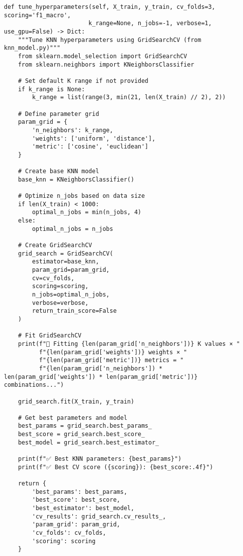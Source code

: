 \begin{verbatim}
def tune_hyperparameters(self, X_train, y_train, cv_folds=3, scoring='f1_macro', 
                        k_range=None, n_jobs=-1, verbose=1, use_gpu=False) -> Dict:
    """Tune KNN hyperparameters using GridSearchCV (from knn_model.py)"""
    from sklearn.model_selection import GridSearchCV
    from sklearn.neighbors import KNeighborsClassifier
    
    # Set default K range if not provided
    if k_range is None:
        k_range = list(range(3, min(21, len(X_train) // 2), 2))
    
    # Define parameter grid
    param_grid = {
        'n_neighbors': k_range,
        'weights': ['uniform', 'distance'],
        'metric': ['cosine', 'euclidean']
    }
    
    # Create base KNN model
    base_knn = KNeighborsClassifier()
    
    # Optimize n_jobs based on data size
    if len(X_train) < 1000:
        optimal_n_jobs = min(n_jobs, 4)
    else:
        optimal_n_jobs = n_jobs
    
    # Create GridSearchCV
    grid_search = GridSearchCV(
        estimator=base_knn,
        param_grid=param_grid,
        cv=cv_folds,
        scoring=scoring,
        n_jobs=optimal_n_jobs,
        verbose=verbose,
        return_train_score=False
    )
    
    # Fit GridSearchCV
    print(f"🔄 Fitting {len(param_grid['n_neighbors'])} K values × "
          f"{len(param_grid['weights'])} weights × "
          f"{len(param_grid['metric'])} metrics = "
          f"{len(param_grid['n_neighbors']) * len(param_grid['weights']) * len(param_grid['metric'])} combinations...")
    
    grid_search.fit(X_train, y_train)
    
    # Get best parameters and model
    best_params = grid_search.best_params_
    best_score = grid_search.best_score_
    best_model = grid_search.best_estimator_
    
    print(f"✅ Best KNN parameters: {best_params}")
    print(f"✅ Best CV score ({scoring}): {best_score:.4f}")
    
    return {
        'best_params': best_params,
        'best_score': best_score,
        'best_estimator': best_model,
        'cv_results': grid_search.cv_results_,
        'param_grid': param_grid,
        'cv_folds': cv_folds,
        'scoring': scoring
    }
\end{verbatim}

